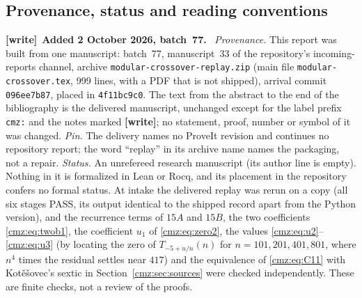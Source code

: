 \documentclass[11pt,letterpaper]{article}
\numberwithin{equation}{section}
\theoremstyle{definition}\newtheorem{definition}[theorem]{Definition}
\theoremstyle{remark}\newtheorem{remark}[theorem]{Remark}
\newenvironment{writenote}[1][]{\par\smallskip\begingroup\small
 \noindent\textbf{[write]}\if\relax\detokenize{#1}\relax\else~\textbf{#1.}\fi\ }%
 {\par\endgroup\smallskip}
\begin{document}
\subsection{Provenance, status and reading conventions}
\label{cmz:provenance}
\begin{writenote}[Added 2 October 2026, batch~77]
\emph{Provenance.} This report was built from one manuscript: batch~77,
manuscript~33 of the repository's incoming-reports channel, archive
\nolinkurl{modular-crossover-replay.zip} (main file
\nolinkurl{modular-crossover.tex}, 999 lines, with a PDF that is not
shipped), arrival commit \texttt{096ee7b87}, placed in \texttt{4f11bc9c0}.
The text from the abstract to the end of the bibliography is the delivered
manuscript, unchanged except for the label prefix \texttt{cmz:} and the
notes marked \textbf{[write]}; no statement, proof, number or symbol of it
was changed. \emph{Pin.} The delivery names no ProveIt revision and
continues no repository report; the word ``replay'' in its archive name
names the packaging, not a repair. \emph{Status.} An unrefereed research
manuscript (its author line is empty). Nothing in it is formalized in Lean
or Rocq, and its placement in the repository confers no formal status. At
intake the delivered replay was rerun on a copy (all six stages PASS, its
output identical to the shipped record apart from the Python version), and
the recurrence terms of $15A$ and $15B$, the two coefficients
\eqref{cmz:eq:twob1}, the coefficient $u_1$ of \eqref{cmz:eq:zero2}, the
values \eqref{cmz:eq:u2}--\eqref{cmz:eq:u3} (by locating the zero of
$T_{-5+u/n}(n)$ for $n=101,201,401,801$, where $n^4$ times the residual
settles near $417$) and the equivalence of \eqref{cmz:eq:C11} with
Kot\v{e}\v{s}ovec's sextic in Section~\ref{cmz:sec:sources} were checked
independently. These are finite checks, not a review of the proofs.
\end{writenote}
\end{document}
